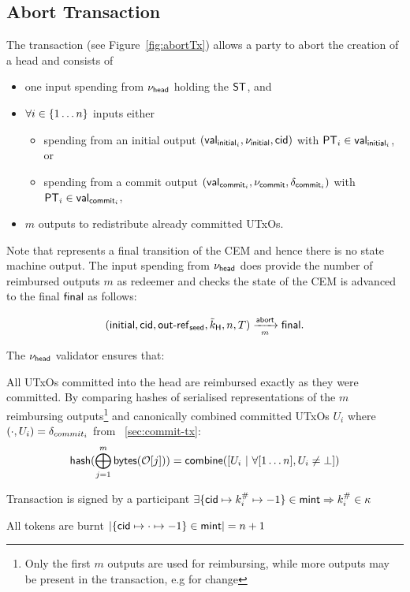 \subsection{Abort Transaction}\label{sec:abort-tx}

\begin{samepage}
	The \mtxAbort{} transaction (see Figure~\ref{fig:abortTx}) allows a
	party to abort the creation of a head and consists of
	\begin{itemize}
		\item one input spending from $\nu_\mathsf{head}$ holding the $\mathsf{ST}$, and
		\item $\forall i \in \{1 \dots n\}$ inputs either
		      \begin{itemize}
			      \item spending from an initial output $(\mathsf{val}_{\mathsf{initial}_{i}}, \nu_{\mathsf{initial}}, \mathsf{cid})$ with $\mathsf{PT}_{i} \in \mathsf{val}_{\mathsf{initial}_{i}}$, or
			      \item spending from a commit output $(\mathsf{val}_{\mathsf{commit}_{i}}, \nu_{\mathsf{commit}}, \delta_{\mathsf{commit}_{i}})$ with $\mathsf{PT}_{i} \in \mathsf{val}_{\mathsf{commit}_{i}}$,
		      \end{itemize}
		\item $m$ outputs to redistribute already committed UTxOs.
	\end{itemize}
\end{samepage}

\noindent Note that \mtxAbort{} represents a final transition of the CEM and hence there
is no state machine output. The input spending from $\nu_\mathsf{head}$ does provide the
number of reimbursed outputs $m$ as redeemer  and checks the state of the CEM is
advanced to the final $\mathsf{final}$ as follows:

\[
	(\mathsf{initial},\mathsf{cid},\mathsf{out\textsf{-}{}ref}_{\mathsf{seed}},\tilde{k}_{\mathsf{H}},n,T) \xrightarrow[m]{\mathsf{abort}} \mathsf{final}.
\]

\begin{samepage}
	\noindent The $\nu_\mathsf{head}$ validator ensures that:
	\begin{menumerate}
		\item All UTxOs committed into the head are reimbursed exactly as they were
		committed. By comparing hashes of serialised representations of the $m$
		reimbursing outputs\footnote{Only the first $m$ outputs are used for
			reimbursing, while more outputs may be present in the transaction, e.g for
			change} and canonically combined committed UTxOs $U_{i}$ where $(\cdot, U_{i}) = \delta_{commit_{i}}$ from \mtxCom{}~\ref{sec:commit-tx}:
		\[
			\mathsf{hash}(\bigoplus_{j=1}^{m} \mathsf{bytes}(\mathcal{O}[j])) = \mathsf{combine}([U_{i} ~ | ~ \forall [1\dots n], U_{i} \neq \bot])
		\]

		\item Transaction is signed by a participant $\exists \{\mathsf{cid} \mapsto k^{\#}_{i} \mapsto -1\} \in \mathsf{mint} \Rightarrow k^{\#}_{i} \in \kappa$
		\item All tokens are burnt
		$|\{\mathsf{cid} \mapsto \cdot \mapsto -1\} \in \mathsf{mint}| = n + 1$
	\end{menumerate}
\end{samepage}

